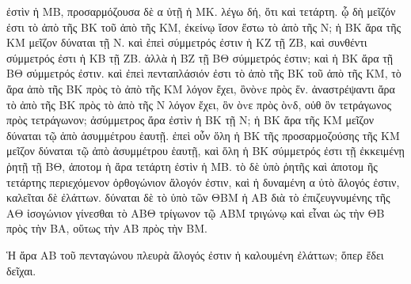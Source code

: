 \begin{Parallel}{}{}
{{ἐστὶν ἡ ΜΒ, προσαρμόζουσα δὲ α ὐτῇ ἡ ΜΚ. λέγω δή,
ὅτι καὶ τετάρτη. ᾧ δὴ μεῖζόν ἐστι τὸ ἀπὸ τῆς ΒΚ
τοῦ ἀπὸ τῆς ΚΜ, ἐκείνῳ ἴσον ἔστω τὸ ἀπὸ τῆς
Ν; ἡ ΒΚ ἄρα τῆς ΚΜ
μεῖζον δύναται τῇ Ν. καὶ ἐπεὶ
σύμμετρός ἐστιν ἡ ΚΖ τῇ ΖΒ, καὶ συνθέντι σύμμετρός ἐστι ἡ ΚΒ τῇ ΖΒ. ἀλλὰ ἡ ΒΖ τῇ ΒΘ σύμμετρός ἐστιν; καὶ ἡ ΒΚ ἄρα τῇ
ΒΘ σύμμετρός ἐστιν. καὶ ἐπεὶ πενταπλάσιόν ἐστι τὸ ἀπὸ τῆς
ΒΚ τοῦ ἀπὸ τῆς ΚΜ, τὸ ἄρα ἀπὸ τῆς ΒΚ πρὸς τὸ ἀπὸ
τῆς ΚΜ λόγον ἔχει, ὃνὸv{ε} πρὸς ἕν. ἀναστρέψαντι ἄρα
τὸ ἀπὸ τῆς ΒΚ πρὸς τὸ ἀπὸ τῆς Ν λόγον ἔχει, ὃν ὸv{ε}
πρὸς ὸv{δ}, οὐθ ὃν τετράγωνος πρὸς τετράγωνον; ἀσύμμετρος
ἄρα ἐστὶν ἡ ΒΚ τῇ Ν; ἡ ΒΚ ἄρα τῆς ΚΜ μεῖζον
δύναται τῷ ἀπὸ ἀσυμμέτρου ἑαυτῇ. ἐπεὶ οὖν ὅλη
ἡ ΒΚ τῆς προσαρμοζούσης τῆς ΚΜ μεῖζον δύναται τῷ ἀπὸ
ἀσυμμέτρου ἑαυτῇ, καὶ ὅλη ἡ ΒΚ σύμμετρός ἐστι τῇ ἐκκειμένῃ
ῥητῇ τῇ ΒΘ, ἀποτομ ὴ ἄρα τετάρτη ἐστὶν ἡ ΜΒ. τὸ δὲ ὑπὸ ῥητῆς
καὶ ἀποτομ ῆς τετάρτης περιεχόμενον ὀρθογώνιον ἄλογόν ἐστιν,
καὶ ἡ δυναμένη α ὐτὸ ἄλογός ἐστιν, καλεῖται δὲ ἐλάττων. δύναται
δὲ τὸ ὑπὸ τῶν ΘΒΜ ἡ ΑΒ διὰ τὸ ἐπιζευγνυμένης
τῆς ΑΘ ἰσογώνιον γίνεσθαι τὸ ΑΒΘ τρίγωνον τῷ ΑΒΜ τριγώνῳ
καὶ εἶναι ὡς τὴν ΘΒ πρὸς τὴν ΒΑ, οὕτως τὴν ΑΒ πρὸς
τὴν ΒΜ.}

{\greekfont Ἡ ἄρα ΑΒ τοῦ πενταγώνου πλευρὰ ἄλογός ἐστιν ἡ καλουμένη
ἐλάττων; ὅπερ ἔδει δεῖχαι.}}

\end{Parallel}
